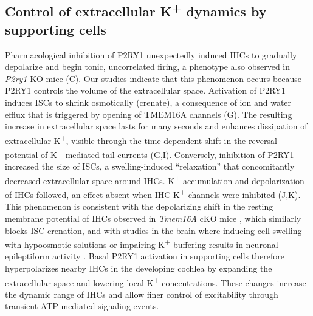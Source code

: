 \documentclass[9pt,lineno]{elife}
\begin{document}
\subsection{Control of extracellular K\textsuperscript{+} dynamics by supporting cells}
Pharmacological inhibition of P2RY1 unexpectedly induced IHCs to gradually depolarize and begin tonic, uncorrelated firing, a phenotype also observed in \textit{P2ry1} KO mice (C). Our studies indicate that this phenomenon occurs because P2RY1 controls the volume of the extracellular space. Activation of P2RY1 induces ISCs to shrink osmotically (crenate), a consequence of ion and water efflux that is triggered by opening of TMEM16A channels (G). The resulting increase in extracellular space lasts for many seconds and enhances dissipation of extracellular K\textsuperscript{+}, visible through the time-dependent shift in the reversal potential of K\textsuperscript{+} mediated tail currents (G,I). Conversely, inhibition of P2RY1 increased the size of ISCs, a swelling-induced “relaxation” that concomitantly decreased extracellular space around IHCs. K\textsuperscript{+} accumulation and depolarization of IHCs followed, an effect absent when IHC K\textsuperscript{+} channels were inhibited (J,K). This phenomenon is consistent with the depolarizing shift in the resting membrane potential of IHCs observed in \textit{Tmem16A} cKO mice \citep{Wang2015}, which similarly blocks ISC crenation, and with studies in the brain where inducing cell swelling with hypoosmotic solutions or impairing K\textsuperscript{+} buffering results in neuronal epileptiform activity \citep{Larson2018,Murphy2017,Thrane2013}. Basal P2RY1 activation in supporting cells therefore hyperpolarizes nearby IHCs in the developing cochlea by expanding the extracellular space and lowering local K\textsuperscript{+} concentrations. These changes increase the dynamic range of IHCs and allow finer control of excitability through transient ATP mediated signaling events. 
\end{document}
